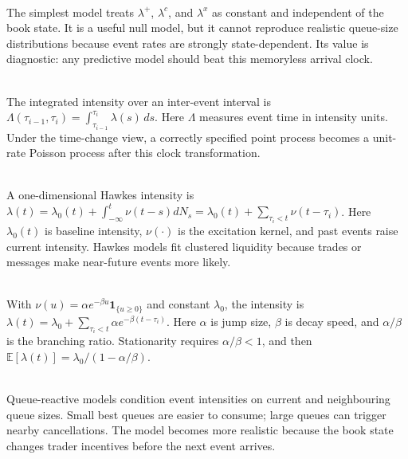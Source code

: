 \documentclass[a4paper,oneside,openany]{book}
\begin{document}
\begin{model} \\
The simplest model treats $\lambda^+$, $\lambda^c$, and $\lambda^x$ as constant and independent of the book state. It is a useful null model, but it cannot reproduce realistic queue-size distributions because event rates are strongly state-dependent. Its value is diagnostic: any predictive model should beat this memoryless arrival clock.
\end{model}

\begin{definition} \\
The integrated intensity over an inter-event interval is $\Lambda(\tau_{i-1},\tau_i)=\int_{\tau_{i-1}}^{\tau_i}\lambda(s)\,ds$. Here $\Lambda$ measures event time in intensity units. Under the time-change view, a correctly specified point process becomes a unit-rate Poisson process after this clock transformation.
\end{definition}

\begin{model} \\
A one-dimensional Hawkes intensity is $\lambda(t)=\lambda_0(t)+\int_{-\infty}^{t}\nu(t-s)dN_s=\lambda_0(t)+\sum_{\tau_i<t}\nu(t-\tau_i)$. Here $\lambda_0(t)$ is baseline intensity, $\nu(\cdot)$ is the excitation kernel, and past events raise current intensity. Hawkes models fit clustered liquidity because trades or messages make near-future events more likely.
\end{model}

\begin{model} \\
With $\nu(u)=\alpha e^{-\beta u}\mathbf{1}_{\{u\geq0\}}$ and constant $\lambda_0$, the intensity is $\lambda(t)=\lambda_0+\sum_{\tau_i<t}\alpha e^{-\beta(t-\tau_i)}$. Here $\alpha$ is jump size, $\beta$ is decay speed, and $\alpha/\beta$ is the branching ratio. Stationarity requires $\alpha/\beta<1$, and then $\mathbb{E}[\lambda(t)]=\lambda_0/(1-\alpha/\beta)$.
\end{model}

\begin{mechanism} \\
Queue-reactive models condition event intensities on current and neighbouring queue sizes. Small best queues are easier to consume; large queues can trigger nearby cancellations. The model becomes more realistic because the book state changes trader incentives before the next event arrives.
\end{mechanism}
\end{document}
